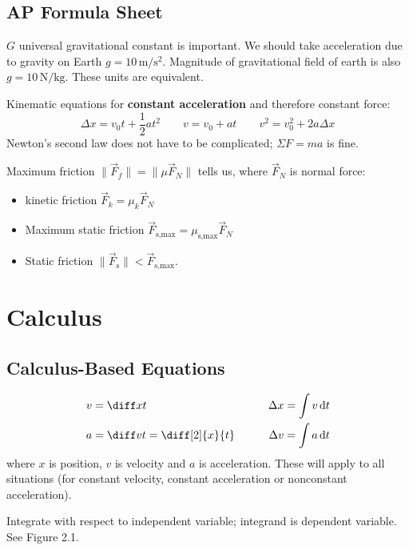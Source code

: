 \documentclass{article}
\newcommand{\theorem}[2]{\begin{tcolorbox}[title={#1},colback=blue!5!white,colframe=blue!75!black,parbox=false] #2 \end{tcolorbox}}
\begin{document}
\subsection{AP Formula Sheet}

$G$ universal gravitational constant is important. We should take acceleration due to gravity on Earth $g=10\,\si{\meter\per\second\squared}$. Magnitude of gravitational field of earth is also $g=10\,\si{\newton\per\kilo\gram}$. These units are equivalent.

Kinematic equations for \textbf{constant acceleration} and therefore constant force:
\begin{equation*}
    \Delta x=v_0t+\frac12at^2 \qquad
	v=v_0+at \qquad
	v^2=v_0^2+2a\Delta x
\end{equation*}
Newton's second law does not have to be complicated; $\Sigma F=ma$ is fine.

Maximum friction $\lVert \vec{F}_f \rVert =\lVert \mu \vec{F}_N \rVert $ tells us, where $\vec{F}_N$ is normal force:
\begin{itemize}
	\item kinetic friction $\vec{F}_k=\mu_k \vec{F}_N$
	\item Maximum static friction $\vec{F}_\text{s,max}=\mu_\text{s,max}\vec{F}_N$
	\item Static friction $\lVert \vec{F}_\text{s} \rVert <\vec{F}_\text{s,max}$.
\end{itemize}

\section{Calculus}

\subsection{Calculus-Based Equations}

\theorem{Kinematics}{
	\begin{alignat*}{2}
		v&=\diff xt &\qquad \Delta x=\int v\,\mathrm{d}t \\
		a&=\diff vt=\diff[2]{x}{t} &\qquad \Delta v=\int a\,\mathrm{d}t
	\end{alignat*}
	where $x$ is position, $v$ is velocity and $a$ is acceleration. These will apply to all situations (for constant velocity, constant acceleration or nonconstant acceleration).
}

Integrate with respect to independent variable; integrand is dependent variable. See Figure 2.1.
\end{document}
